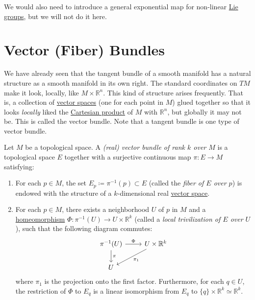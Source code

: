 \documentclass{article}
\newcounter{definition}[section]
\begin{document}
    We would also need to introduce a general exponential map for non-linear \hyperref[def:lie-group]{Lie groups}, but we will not do it here. 

\section{Vector (Fiber) Bundles}

  We have already seen that the tangent bundle of a smooth manifold has a natural structure as a smooth manifold in its own right. The standard coordinates on $TM$ make it look, locally, like $M \times \mathbb{R}^n$. This kind of structure arises frequently. That is, a collection of \hyperref[lin-def:vector-space]{vector spaces} (one for each point in $M$) glued together so that it looks \textit{locally} liked the \hyperref[st-def:cart-prod-2]{Cartesian product} of $M$ with $\mathbb{R}^n$, but globally it may not be. This is called the vector bundle. Note that a tangent bundle is one type of vector bundle. 

  \begin{definition}
    \label{def:real-vector-bundle-of-rank-k}
  Let $M$ be a topological space. A \textit{(real) vector bundle of rank $k$ over $M$} is a topological space $E$ together with a surjective continuous map $\pi: E \to M$ satisfying: 
  \begin{enumerate}
      \item For each $p \in M$, the set $E_p \coloneqq \pi^{-1} (p) \subset E$ (called the \textit{fiber of $E$ over $p$}) is endowed with the structure of a $k$-dimensional real \hyperref[lin-def:vector-space]{vector space}. 
      \item For each $p \in M$, there exists a neighborhood $U$ of $p$ in $M$ and a \hyperref[pst-def:homeomorphism]{homeomorphism} $\Phi: \pi^{-1}(U) \to U \times \mathbb{R}^k$ (called a \textit{local trivilization of $E$ over $U$}), such that the following diagram commutes: 
      \begin{equation}
        \begin{tikzcd}
              \pi^{-1}(U) \arrow{r}{\Phi} \arrow{d}{\pi}& U \times \mathbb{R}^k \arrow{ld}{\pi_1}\\
              U
              \end{tikzcd}
      \end{equation}
      where $\pi_1$ is the projection onto the first factor. Furthermore, for each $q \in U$, the restriction of $\Phi$ to $E_q$ is a linear isomorphism from $E_q$ to $\{q\} \times \mathbb{R}^k \simeq \mathbb{R}^k$. 
  \end{enumerate}
  \end{definition}
\end{document}
